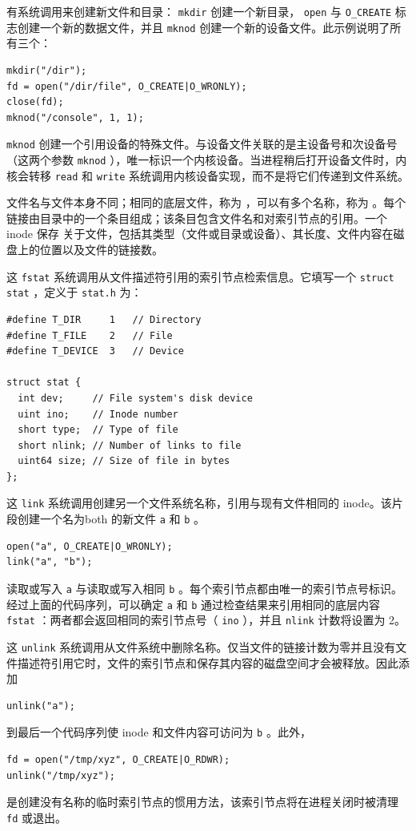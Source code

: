 有系统调用来创建新文件和目录：
    \lstinline{mkdir}    创建一个新目录，
    \lstinline{open}    与
    \lstinline{O_CREATE}    标志创建一个新的数据文件，并且
    \lstinline{mknod}    创建一个新的设备文件。此示例说明了所有三个：
\begin{lstlisting}[]
mkdir("/dir");
fd = open("/dir/file", O_CREATE|O_WRONLY);
close(fd);
mknod("/console", 1, 1);
\end{lstlisting}   
    \lstinline{mknod}    创建一个引用设备的特殊文件。与设备文件关联的是主设备号和次设备号（这两个参数
    \lstinline{mknod}    ），唯一标识一个内核设备。当进程稍后打开设备文件时，内核会转移
    \lstinline{read}    和
    \lstinline{write}    系统调用内核设备实现，而不是将它们传递到文件系统。  

文件名与文件本身不同；相同的底层文件，称为
        ，可以有多个名称，称为
        。每个链接由目录中的一个条目组成；该条目包含文件名和对索引节点的引用。一个 inode 保存
        关于文件，包括其类型（文件或目录或设备）、其长度、文件内容在磁盘上的位置以及文件的链接数。  

这
    \lstinline{fstat}    系统调用从文件描述符引用的索引节点检索信息。它填写一个
    \lstinline{struct}   
    \lstinline{stat}    ，定义于
    \lstinline{stat.h}           为：
\begin{lstlisting}[]
#define T_DIR     1   // Directory
#define T_FILE    2   // File
#define T_DEVICE  3   // Device

struct stat {
  int dev;     // File system's disk device
  uint ino;    // Inode number
  short type;  // Type of file
  short nlink; // Number of links to file
  uint64 size; // Size of file in bytes
};
\end{lstlisting}     

这
    \lstinline{link}    系统调用创建另一个文件系统名称，引用与现有文件相同的 inode。该片段创建一个名为both 的新文件
    \lstinline{a}    和
    \lstinline{b}    。
\begin{lstlisting}[]
open("a", O_CREATE|O_WRONLY);
link("a", "b");
\end{lstlisting}    读取或写入
    \lstinline{a}    与读取或写入相同
    \lstinline{b}    。每个索引节点都由唯一的索引节点号标识。经过上面的代码序列，可以确定
    \lstinline{a}    和
    \lstinline{b}    通过检查结果来引用相同的底层内容
    \lstinline{fstat}    ：两者都会返回相同的索引节点号（    \lstinline{ino}    ），并且
    \lstinline{nlink}    计数将设置为 2。  

这
    \lstinline{unlink}    系统调用从文件系统中删除名称。仅当文件的链接计数为零并且没有文件描述符引用它时，文件的索引节点和保存其内容的磁盘空间才会被释放。因此添加
\begin{lstlisting}[]
unlink("a");
\end{lstlisting}    到最后一个代码序列使 inode 和文件内容可访问为
    \lstinline{b}    。此外，
\begin{lstlisting}[]
fd = open("/tmp/xyz", O_CREATE|O_RDWR);
unlink("/tmp/xyz");
\end{lstlisting}    是创建没有名称的临时索引节点的惯用方法，该索引节点将在进程关闭时被清理
    \lstinline{fd}    或退出。  

